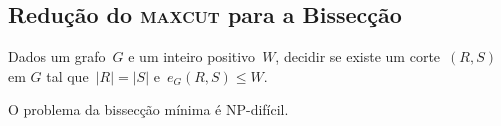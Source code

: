 	\bigskip


\subsection{Redução do \textbf{\textsc{maxcut}} para a Bissecção}
	\begin{prob}
		Dados um grafo~${G}$
		e um inteiro positivo~${W}$, decidir se existe um
		corte~$(R,S)$ em $G$ tal 
		que~$|R|=|S|$ e~${e_G(R,S)\le W}$.
		
	\end{prob}
	\begin{teo}
		O problema da bissecção mínima é NP-difícil.
	\end{teo}
